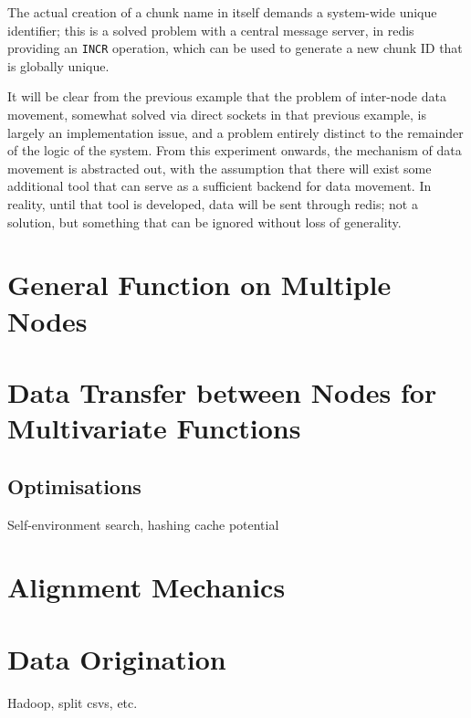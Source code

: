\documentclass[a4paper,10pt]{article}
\begin{document}
The actual creation of a chunk name in itself demands a system-wide unique
identifier; this is a solved problem with a central message server, in redis
providing an \texttt{INCR} operation, which can be used to generate a new chunk
ID that is globally unique.

It will be clear from the previous example that the problem of inter-node data
movement, somewhat solved via direct sockets in that previous example, is
largely an implementation issue, and a problem entirely distinct to the
remainder of the logic of the system.
From this experiment onwards, the mechanism of data movement is abstracted out,
with the assumption that there will exist some additional tool that can serve
as a sufficient backend for data movement.
In reality, until that tool is developed, data will be sent through redis; not
a solution, but something that can be ignored without loss of generality.


\section{General Function on Multiple Nodes}
\section{Data Transfer between Nodes for Multivariate Functions}
\subsection{Optimisations}
Self-environment search, hashing cache potential
\section{Alignment Mechanics}
\section{Data Origination}
Hadoop, split csvs, etc.
\end{document}
